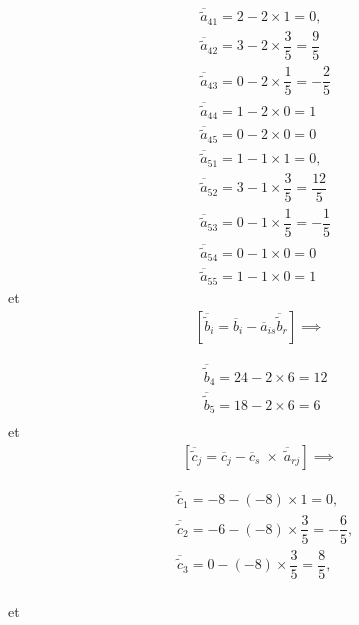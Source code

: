 \documentclass{report}
\begin{document}
\begin{multicols*}{2}
\begin{align*}
    &\overline{\tilde{a}}_{41} = 2 - 2 \times 1 = 0, \\
    &\overline{\tilde{a}}_{42} = 3 - 2 \times \dfrac{3}{5} = \dfrac{9}{5} \\ 
    &\overline{\tilde{a}}_{43} = 0 - 2 \times \dfrac{1}{5} = -\dfrac{2}{5} \\ 
    &\overline{\tilde{a}}_{44} = 1 - 2 \times 0  = 1 \\ 
    &\overline{\tilde{a}}_{45} = 0 - 2 \times 0 = 0 \\
    &\overline{\tilde{a}}_{51} = 1 - 1 \times 1 = 0, \\
    &\overline{\tilde{a}}_{52} = 3 - 1 \times \dfrac{3}{5} = \dfrac{12}{5} \\ 
    &\overline{\tilde{a}}_{53} = 0 - 1 \times \dfrac{1}{5} = -\dfrac{1}{5} \\ 
    &\overline{\tilde{a}}_{54} = 0 - 1 \times 0  = 0 \\ 
    &\overline{\tilde{a}}_{55} = 1 - 1 \times 0 = 1 
\end{align*}                    
et
\begin{align*}
    \left[ \overline{\tilde{b}}_i = \overline{b}_i - \overline{a}_{is} \overline{\tilde{b}}_r \right] 
    \implies
\end{align*}
\vspace{-3em} %

\begin{align*}
    &\overline{\tilde{b}}_4 = 24 - 2 \times 6 =  12  \\
    &\overline{\tilde{b}}_5 = 18 - 2 \times 6 =  6  \\
\end{align*}
et 
\begin{align*}
    \left[ \overline{\tilde{c}}_{j} = 
    \overline{c}_{j} 
- \overline{c}_{s} \; \times \; \overline{\tilde{a}}_{rj}  \right] 
\implies
\end{align*}
\vspace{-3em}%

\begin{align*}
    &\overline{\tilde{c}}_1 = -8  - (-8)\times 1 = 0 , \\ 
    &\overline{\tilde{c}}_2 = -6  - (-8)\times \dfrac{3}{5} = -\dfrac{6}{5} , \\ 
    &\overline{\tilde{c}}_3 = 0  - (-8)\times \dfrac{3}{5} = \dfrac{8}{5} , \\ 
\end{align*}

et 


\end{multicols*}
\end{document}
